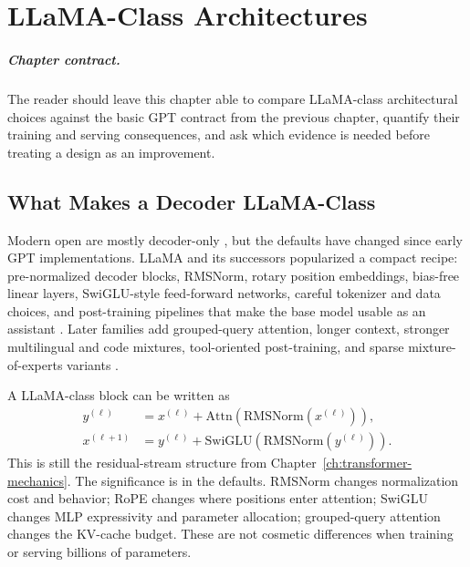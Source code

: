 \chapter{LLaMA-Class Architectures}
\label{ch:llama-class-architectures}


\paragraph{Chapter contract.} The reader should leave this chapter able to compare LLaMA-class architectural choices against the basic GPT contract from the previous chapter, quantify their training and serving consequences, and ask which evidence is needed before treating a design as an improvement.

\section{What Makes a Decoder LLaMA-Class}
\label{sec:what-makes-llama-class}

Modern open \llms are mostly decoder-only \transformers, but the defaults have changed since early GPT implementations. LLaMA and its successors popularized a compact recipe: pre-normalized decoder blocks, RMSNorm, rotary position embeddings, bias-free linear layers, SwiGLU-style feed-forward networks, careful tokenizer and data choices, and post-training pipelines that make the base model usable as an assistant \cite{touvron2023llama,touvron2023llama2,dubey2024llama3}. Later families add grouped-query attention, longer context, stronger multilingual and code mixtures, tool-oriented post-training, and sparse mixture-of-experts variants \cite{ainslie2023gqa,deepseek2024v3,kimi2025k2}.

A LLaMA-class block can be written as
\begin{align}
  y^{(\ell)}
    &= x^{(\ell)} +
       \mathrm{Attn}(\mathrm{RMSNorm}(x^{(\ell)})),\\
  x^{(\ell+1)}
    &= y^{(\ell)} +
       \mathrm{SwiGLU}(\mathrm{RMSNorm}(y^{(\ell)})).
\end{align}
This is still the residual-stream structure from Chapter~\ref{ch:transformer-mechanics}. The significance is in the defaults. RMSNorm changes normalization cost and behavior; RoPE changes where positions enter attention; SwiGLU changes MLP expressivity and parameter allocation; grouped-query attention changes the KV-cache budget. These are not cosmetic differences when training or serving billions of parameters.

